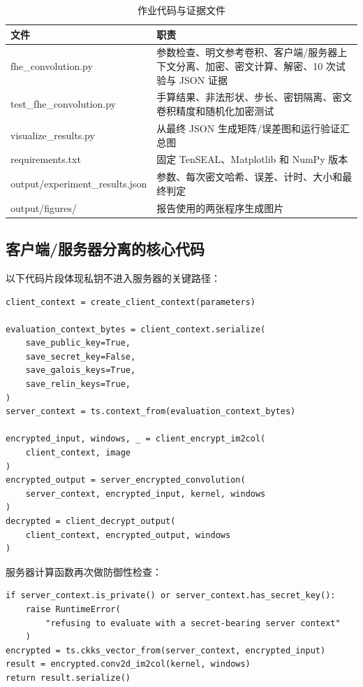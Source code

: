 \documentclass[UTF8,a4paper,zihao=-4]{ctexart}
\begin{document}
\begin{table}[H]
\centering
\caption{作业代码与证据文件}
\label{tab:files}
\begin{tabularx}{\textwidth}{>{\ttfamily\small}p{}>{\raggedright\arraybackslash}X}
\toprule
文件 & 职责\\
\midrule
fhe\_convolution.py & 参数检查、明文参考卷积、客户端/服务器上下文分离、加密、密文计算、解密、10 次试验与 JSON 证据\\
test\_fhe\_convolution.py & 手算结果、非法形状、步长、密钥隔离、密文卷积精度和随机化加密测试\\
visualize\_results.py & 从最终 JSON 生成矩阵/误差图和运行验证汇总图\\
requirements.txt & 固定 TenSEAL、Matplotlib 和 NumPy 版本\\
output/experiment\_results.json & 参数、每次密文哈希、误差、计时、大小和最终判定\\
output/figures/ & 报告使用的两张程序生成图片\\
\bottomrule
\end{tabularx}
\end{table}

\subsection{客户端/服务器分离的核心代码}

以下代码片段体现私钥不进入服务器的关键路径：

\begin{lstlisting}[style=pythonstyle]
client_context = create_client_context(parameters)

evaluation_context_bytes = client_context.serialize(
    save_public_key=True,
    save_secret_key=False,
    save_galois_keys=True,
    save_relin_keys=True,
)
server_context = ts.context_from(evaluation_context_bytes)

encrypted_input, windows, _ = client_encrypt_im2col(
    client_context, image
)
encrypted_output = server_encrypted_convolution(
    server_context, encrypted_input, kernel, windows
)
decrypted = client_decrypt_output(
    client_context, encrypted_output, windows
)
\end{lstlisting}

服务器计算函数再次做防御性检查：

\begin{lstlisting}[style=pythonstyle]
if server_context.is_private() or server_context.has_secret_key():
    raise RuntimeError(
        "refusing to evaluate with a secret-bearing server context"
    )
encrypted = ts.ckks_vector_from(server_context, encrypted_input)
result = encrypted.conv2d_im2col(kernel, windows)
return result.serialize()
\end{lstlisting}
\end{document}
